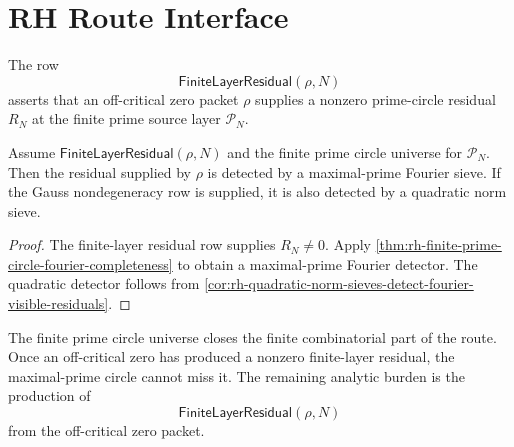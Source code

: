 \section{RH Route Interface}
\label{sec:rh-finite-prime-circle-universe-rh-interface}

\begin{definition}[FiniteLayerResidual]
\label{def:rh-finite-layer-residual}
The row
$$
\mathsf{FiniteLayerResidual}(\rho,N)
$$
asserts that an off-critical zero packet $\rho$ supplies a nonzero
prime-circle residual $R_N$ at the finite prime source layer
$\mathcal P_N$.
\end{definition}

\begin{theorem}
\label{thm:rh-finite-layer-residual-cannot-be-sieve-invisible}
Assume $\mathsf{FiniteLayerResidual}(\rho,N)$ and the finite prime
circle universe for $\mathcal P_N$.  Then the residual supplied by
$\rho$ is detected by a maximal-prime Fourier sieve.  If the Gauss
nondegeneracy row is supplied, it is also detected by a quadratic norm
sieve.
\end{theorem}

\begin{proof}
The finite-layer residual row supplies $R_N\ne0$.  Apply
\autoref{thm:rh-finite-prime-circle-fourier-completeness} to obtain a
maximal-prime Fourier detector.  The quadratic detector follows from
\autoref{cor:rh-quadratic-norm-sieves-detect-fourier-visible-residuals}.
\end{proof}

\begin{principle}
\label{prin:rh-finite-prime-circle-audit-boundary}
The finite prime circle universe closes the finite combinatorial part
of the route.  Once an off-critical zero has produced a nonzero
finite-layer residual, the maximal-prime circle cannot miss it.  The
remaining analytic burden is the production of
$$
\mathsf{FiniteLayerResidual}(\rho,N)
$$
from the off-critical zero packet.
\end{principle}

